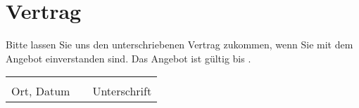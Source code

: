 \documentclass[a4paper,oneside,11pt,DIV=14]{scrartcl}
\begin{document}
\section*{Vertrag}
\setdatetoday
\addtocounter{datenumber}{21}%
\setdatebynumber{\thedatenumber}%
Bitte lassen Sie uns den unterschriebenen Vertrag zukommen, wenn Sie mit dem Angebot einverstanden sind. Das Angebot ist g\"{u}ltig bis \textbf{\datedate}.

\vspace{2.cm}
\renewcommand{\arraystretch}{2}
\noindent
\begin{tabular}{lp{2em}l}
 \hspace{6cm}   && \hspace{6cm} \\\cline{1-1}\cline{3-3}
 Ort, Datum     && Unterschrift
\end{tabular} 
\end{document}
